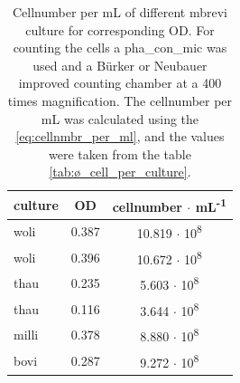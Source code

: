 \begin{table}[ht]
\centering
\caption[Cellnumber per mL of different \acrfull{mbrevi} culture for corresponding \acrfull{OD}.]{Cellnumber per mL of different \acrfull{mbrevi} culture for corresponding \acrfull{OD}. For counting the cells a \gls{pha_con_mic} was used and a Bürker or Neubauer improved counting chamber at a 400 times magnification. The cellnumber per mL was calculated using the \cref{eq:cellnmbr_per_ml}, and the values were taken from the table \ref{tab:ø_cell_per_culture}.} 
\label{tab:cellnumb}
\begin{tabular}{lcc}
  \toprule
\textbf{culture} & \textbf{\acrshort{OD}} & \textbf{cellnumber $\cdot$ mL\textsuperscript{-1}} \\ 
  \midrule
\acrshort{woli} & 0.387 & 10.819 $\cdot$ 10\textsuperscript{8} \\ 
  \acrshort{woli} & 0.396 & 10.672 $\cdot$ 10\textsuperscript{8}\\ 
  \acrshort{thau} & 0.235 & 5.603 $\cdot$ 10\textsuperscript{8}\\ 
  \acrshort{thau} & 0.116 & 3.644 $\cdot$ 10\textsuperscript{8}\\ 
  \acrshort{milli} & 0.378 & 8.880 $\cdot$ 10\textsuperscript{8}\\ 
  \acrshort{bovi} & 0.287 & 9.272 $\cdot$ 10\textsuperscript{8}\\ 
   \bottomrule
\end{tabular}
\end{table}
